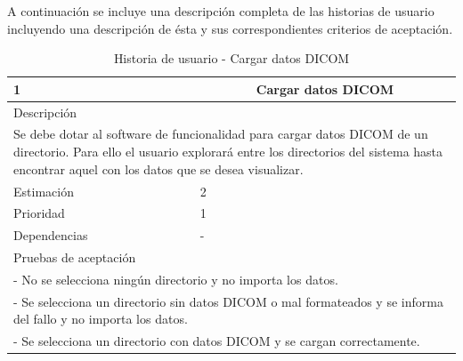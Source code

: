 A continuación se incluye una descripción completa de las historias de usuario incluyendo una descripción de ésta y sus correspondientes criterios de aceptación.

\begin{table}[H]
	\begin{center}
		\begin{tabular} {|l|c|l|}
			\hline
			1 & \multicolumn{2}{c|}{Cargar datos DICOM} \\ \hline \hline
			\multicolumn{3}{|l|}{Descripción} \\ \hline
			\multicolumn{3}{|p{12cm}|}{Se debe dotar al software de funcionalidad para cargar datos DICOM de un directorio. Para ello el usuario explorará entre los directorios del sistema hasta encontrar aquel con los datos que se desea visualizar.} \\ \hline
			\multicolumn{2}{|l|}{Estimación} & 2 \\ \hline
			\multicolumn{2}{|l|}{Prioridad} & 1 \\ \hline
			\multicolumn{2}{|l|}{Dependencias} & - \\ \hline
			\multicolumn{3}{|l|}{Pruebas de aceptación} \\ \hline
			\multicolumn{3}{|p{12cm}|}{ - No se selecciona ningún directorio y no importa los datos.} \\ 
			\multicolumn{3}{|p{12cm}|}{ - Se selecciona un directorio sin datos DICOM o mal formateados y se informa del fallo y no importa los datos.} \\ 
			\multicolumn{3}{|p{12cm}|}{ - Se selecciona un directorio con datos DICOM y se cargan correctamente.} \\ \hline
		\end{tabular}
	\end{center}
	\caption{Historia de usuario - Cargar datos DICOM}
	\label{tab:hu_cargar_datos_dicom}
\end{table}

